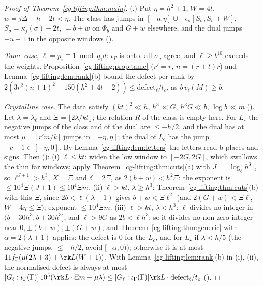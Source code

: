 \begin{proof}[Proof of Theorem~\ref{cg-lifting:thm:main}]
(.) Put $\eta=h^2+1$, $W=4t$,
$w=j\Delta+h-2t<\eta$. The class has jumps in $[-\eta,\eta]\cup-\epsilon_\sigma[S_\sigma,S_\sigma+W]$,
$S_\sigma=\kappa_j(\sigma)-2t$, $=b+w$ on $\Phi_b$ and $G+w$ elsewhere, and the dual jumps
$-u-1$ in the opposite windows ().

\emph{Tame case}, $\ell=p_i\equiv1\bmod q_1d$: $\iota_\Gamma$ is onto, all $\sigma_g$ agree, and $\ell\ge b^{10}$
exceeds the weights. Proposition~\ref{cg-lifting:prop:tame} ($r'=r$, $n=(r+t)r$) and
Lemma~\ref{cg-lifting:lem:rank}(b) bound the defect per rank by $2(3r^2(n+1)^2+150(h^2+4t+2))\le
\mathrm{defect}_\ell/t_c$, as $b\,v_\ell(M)\ge b$.

\emph{Crystalline case}. The data satisfy $(kt)^2\ll h$, $h^3\ll G$, $h^3G\ll b$, $\log b\ll m$
(). Let $\lambda=\lambda_\ell$ and $\Xi=\lfloor2\lambda/kt\rfloor$; the relation $R$ of the class is empty here.
For $L_\star$ the negative jumps of the class and of the dual are $\le-h/2$, and the dual has at most
$\mu=\lfloor r'm/k\rfloor$ jumps in $[-\eta,\eta]$; the dual of $L_c$ has the jump $-c-1\in[-\eta,0]$. By Lemma~\ref{cg-lifting:lem:letters}
the letters read b-places and signs. Then
():
(i) $\ell\le kt$: widen the low window to $[-2G,2G]$, which swallows the thin far windows; apply
Theorem~\ref{cg-lifting:thm:cuts}(a) with $J=\lfloor\log_\ell h^3\rfloor$, so $\ell^{J+1}>h^3$,
$X=\Xi$ and $\delta=2\Xi$, as $2(b+w)<h^2\Xi$: the exponent is $\le10^4\Xi(J+1)\le10^4\Xi m$.
(ii) $\ell>kt$, $\lambda\ge h^3$: Theorem~\ref{cg-lifting:thm:cuts}(b) with this $\Xi$, since
$2b<\ell(\lambda+1)$ gives $b+w<\Xi\ell^2$ (and $2(G+w)<\Xi\ell$, $W+4\eta\le\Xi$); exponent $\le10^4\Xi m$.
(iii) $\ell>kt$, $\lambda<h^3$: $\ell$ divides no integer in $(b-30h^3,b+30h^3]$, and $\ell>9G$ as
$2b<\ell h^3$; so it divides no non-zero integer near $0,\pm(b+w),\pm(G+w)$, and
Theorem~\ref{cg-lifting:thm:generic} with $\alpha=2(\lambda+1)$ applies: the defect is $0$ for the $L_c$,
and for $L_\star$ if $\lambda<h/5$ (the negative jumps, $\le-h/2$, avoid $[-\alpha,0)$); otherwise it is at
most $11f_\Gamma(\mu(2\lambda+3)+\rk L(W+1))$.
With Lemma~\ref{cg-lifting:lem:rank}(b) in (i), (ii), the normalised defect is always at most
$[G_\ell:\iota_\Gamma(\Gamma)]\,10^5(\rk L\cdot\Xi m+\mu\lambda)\le[G_\ell:\iota_\Gamma(\Gamma)]\rk
L\cdot\mathrm{defect}_\ell/t_c$ ().
\end{proof}

